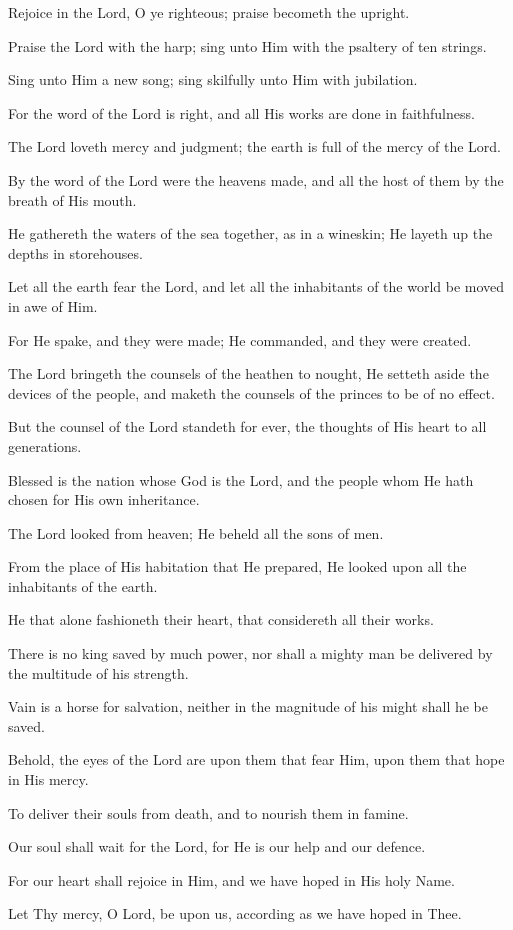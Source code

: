 Rejoice in the Lord, O ye righteous; praise becometh the upright.

Praise the Lord with the harp; sing unto Him with the psaltery of ten strings.

Sing unto Him a new song; sing skilfully unto Him with jubilation.

For the word of the Lord is right, and all His works are done in faithfulness.

The Lord loveth mercy and judgment; the earth is full of the mercy of the Lord.

By the word of the Lord were the heavens made, and all the host of them by the breath of His mouth.

He gathereth the waters of the sea together, as in a wineskin; He layeth up the depths in storehouses.

Let all the earth fear the Lord, and let all the inhabitants of the world be moved in awe of Him.

For He spake, and they were made; He commanded, and they were created.

The Lord bringeth the counsels of the heathen to nought, He setteth aside the devices of the people, and maketh the counsels of the princes to be of no effect.

But the counsel of the Lord standeth for ever, the thoughts of His heart to all generations.

Blessed is the nation whose God is the Lord, and the people whom He hath chosen for His own inheritance.

The Lord looked from heaven; He beheld all the sons of men.

From the place of His habitation that He prepared, He looked upon all the inhabitants of the earth.

He that alone fashioneth their heart, that considereth all their works.

There is no king saved by much power, nor shall a mighty man be delivered by the multitude of his strength.

Vain is a horse for salvation, neither in the magnitude of his might shall he be saved.

Behold, the eyes of the Lord are upon them that fear Him, upon them that hope in His mercy.

To deliver their souls from death, and to nourish them in famine.

Our soul shall wait for the Lord, for He is our help and our defence.

For our heart shall rejoice in Him, and we have hoped in His holy Name.

Let Thy mercy, O Lord, be upon us, according as we have hoped in Thee.
